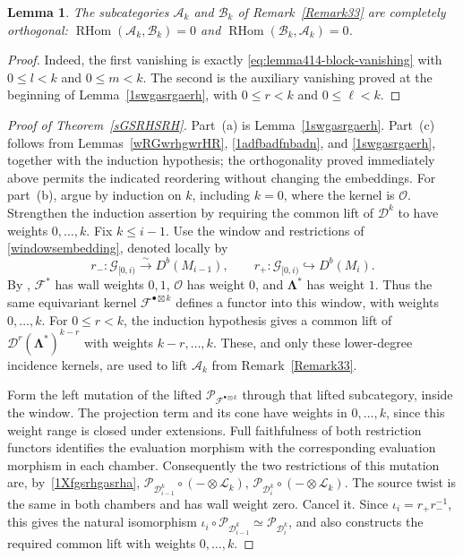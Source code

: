 \documentclass[11pt,letterpaper]{amsart}
\theoremstyle{plain}
\newtheorem{lemma}[theorem]{Lemma}
\theoremstyle{definition}
\theoremstyle{remark}
\numberwithin{equation}{section}
\DeclareMathOperator{\RHom}{RHom}
\begin{document}
\begin{lemma}
The subcategories $\mathcal A_k$ and $\mathcal B_k$ of
Remark~\ref{Remark33} are completely orthogonal:
$
\RHom(\mathcal A_k,\mathcal B_k)=0$ and 
$
\RHom(\mathcal B_k,\mathcal A_k)=0$.
\end{lemma}


\begin{proof}
Indeed, the first vanishing is exactly
\eqref{eq:lemma414-block-vanishing} with $0\le l<k$ and $0\le m<k$.
The second is the auxiliary vanishing proved at the beginning of
Lemma~\ref{1swgasrgaerh}, with $0\le r<k$ and $0\le\ell<k$.
\end{proof}


\begin{proof}[Proof of Theorem~\ref{sGSRHSRH}]
Part~(a) is Lemma~\ref{1swgasrgaerh}.  Part~(c) follows from
Lemmas~\ref{wRGwrhgwrHR}, \ref{1adfbadfnbadn}, and
\ref{1swgasrgaerh}, together with the induction hypothesis; the
orthogonality proved immediately above permits the indicated
reordering without changing the embeddings.
For part~(b), argue by induction on $k$, including $k=0$, where the
kernel is $\mathcal O$.  Strengthen the induction assertion by requiring
the common lift of $\mathcal D^k$ to have weights $0,\ldots,k$.
Fix $k\le i-1$.  Use the window and restrictions of
\eqref{windowsembedding}, denoted locally by
\[
 r_-:\mathcal G_{[0,i)}\xrightarrow{\sim}D^b(M_{i-1}),
 \qquad
 r_+:\mathcal G_{[0,i)}\hookrightarrow D^b(M_i).
\]
By \cite[Theorem~3.21]{TT}, $\mathcal F^*$ has wall weights $0,1$,
$\mathcal O$ has weight $0$, and $\boldsymbol\Lambda^*$ has weight $1$.
Thus the same equivariant kernel $\mathcal F^{\bullet\boxtimes k}$
defines a functor into this window, with weights $0,\ldots,k$.
For $0\le r<k$, the induction hypothesis gives a common lift of
$\mathcal D^r(\boldsymbol\Lambda^*)^{k-r}$ with weights
$k-r,\ldots,k$.  These, and only these lower-degree incidence kernels,
are used to lift $\mathcal A_k$ from Remark~\ref{Remark33}.

Form the left mutation of the lifted
$\mathcal P_{\mathcal F^{\bullet\boxtimes k}}$ through that lifted
subcategory, inside the window.  The projection term and its cone have
weights in $0,\ldots,k$, since this weight range is closed under
extensions.  Full faithfulness of both restriction functors identifies
the evaluation morphism with the corresponding evaluation morphism in
each chamber.  Consequently the two restrictions of this mutation
are, by~\eqref{1Xfgsrhgasrha},
$
 \mathcal P_{\mathcal D_{i-1}^k}\circ(-\otimes\mathscr L_k)$,
$\mathcal P_{\mathcal D_i^k}\circ(-\otimes\mathscr L_k)$.
The source twist is the same in both chambers and has wall weight zero.
Cancel it.  Since $\iota_i=r_+r_-^{-1}$, this gives the natural
isomorphism
$
 \iota_i\circ\mathcal P_{\mathcal D_{i-1}^k}
       \simeq\mathcal P_{\mathcal D_i^k}$,
and also constructs the required common lift with weights
$0,\ldots,k$.  
\end{proof}
\end{document}
